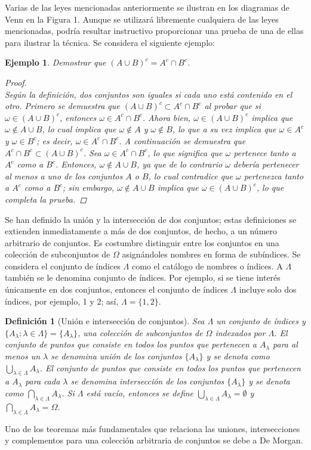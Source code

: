 \documentclass[12pt]{article}
\newtheorem*{example}{Ejemplo}
\newtheorem{definition}{Definición}
\begin{document}
Varias de las leyes mencionadas anteriormente se ilustran en los diagramas de Venn en la Figura 1. Aunque se utilizará libremente cualquiera de las leyes mencionadas, podría resultar instructivo proporcionar una prueba de una de ellas para ilustrar la técnica. Se considera el siguiente ejemplo:
\begin{example}
Demostrar que $(A \cup B)^c = A^c \cap B^c$.
\begin{proof}~\\
    Según la definición, dos conjuntos son iguales si cada uno está contenido en el otro. Primero se demuestra que $(A\cup B)^c \subset A^c\cap B^c $ al probar que si $\omega \in (A\cup B)^c$, entonces $\omega \in A^c \cap B^c$. Ahora bien, $\omega \in (A\cup B)^c$ implica que $\omega \notin A \cup B$, lo cual implica que $\omega \notin A$ y $\omega \notin B$, lo que a su vez implica que $\omega \in A^c$ y $\omega \in B^c$; es decir, $\omega \in A^c\cap B^c$. A continuación se demuestra que $A^c \cap B^c \subset (A\cup B)^c$. Sea $\omega \in A^c \cap B^c$, lo que significa que $\omega$ pertenece tanto a $A^c$ como a $B^c$. Entonces, $\omega \notin A \cup B$, ya que de lo contrario $\omega$ debería pertenecer al menos a uno de los conjuntos $A$ o $B$, lo cual contradice que $\omega$ pertenezca tanto a $A^c$ como a $B^c$; sin embargo, $\omega \notin A \cup B$ implica que $\omega \in (A\cup B)^c$, lo que completa la prueba.
\end{proof}
\end{example}

Se han definido la unión y la intersección de dos conjuntos; estas definiciones se extienden inmediatamente a más de dos conjuntos, de hecho, a un número arbitrario de conjuntos. Es costumbre distinguir entre los conjuntos en una colección de subconjuntos de $\Omega$ asignándoles nombres en forma de subíndices. Se considera el conjunto de índices $\Lambda$ como el catálogo de nombres o índices. A $\Lambda$ también se le denomina conjunto de índices. Por ejemplo, si se tiene interés únicamente en dos conjuntos, entonces el conjunto de índices $\Lambda$ incluye solo dos índices, por ejemplo, 1 y 2; así, $\Lambda=\{1,2\}$.

\begin{definition}[Unión e intersección de conjuntos]
    Sea  $\Lambda$ un conjunto de índices y $\{A_\lambda: \lambda \in \Lambda\}= \{A_\lambda\}$, una colección de subconjuntos de $\Omega$ indexados por $\Lambda$. El conjunto de puntos que consiste en todos los puntos que pertenecen a $A_\lambda$ para al menos un $\lambda$ se denomina unión de los conjuntos $\{A_\lambda\}$ y se denota como $\bigcup\limits_{\lambda\in \Lambda} A_\lambda$. El conjunto de puntos que consiste en todos los puntos que pertenecen a $A_\lambda$ para cada $\lambda$ se denomina intersección de los conjuntos $\{A_\lambda\}$ y se denota como $\bigcap\limits_{\lambda\in\Lambda} A_\lambda$. Si $\Lambda$ está vacío, entonces se define $\bigcup\limits_{\lambda\in \Lambda} A_\lambda = \emptyset$ y $\bigcap\limits_{\lambda\in\Lambda} A_\lambda=\Omega$.
\end{definition}
Uno de los teoremas más fundamentales que relaciona las uniones, intersecciones y complementos para una colección arbitraria de conjuntos se debe a De Morgan.
\end{document}
